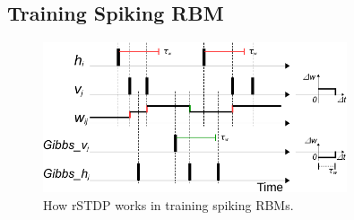 \subsection{Training Spiking RBM}
\begin{figure}
	\centering
	\includegraphics[width=0.8\textwidth]{pics_sdlm/rSTDP_rbm.pdf}
	\caption{How rSTDP works in training spiking RBMs.}
	\label{fig:rSTDP_rbm}
\end{figure}

